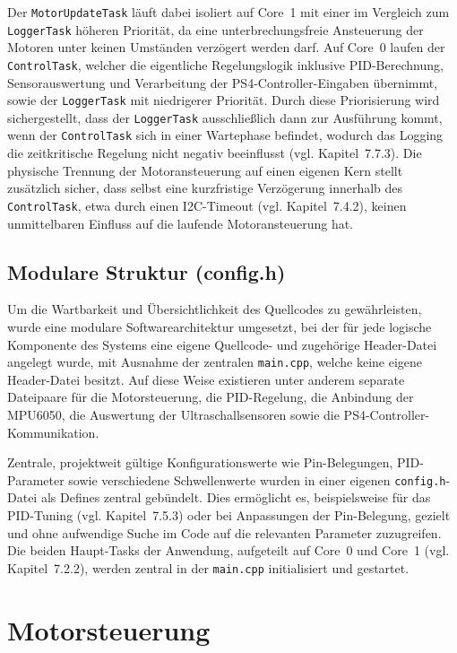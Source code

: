 \documentclass[12pt,ngerman,numbers=noenddot,abstracton,headsepline]{scrreprt}
\begin{document}
Der \texttt{MotorUpdateTask} läuft dabei isoliert auf Core~1 mit einer im Vergleich zum \texttt{LoggerTask} höheren Priorität, da eine unterbrechungsfreie Ansteuerung der Motoren unter keinen Umständen verzögert werden darf. Auf Core~0 laufen der \texttt{ControlTask}, welcher die eigentliche Regelungslogik inklusive PID-Berechnung, Sensorauswertung und Verarbeitung der PS4-Controller-Eingaben übernimmt, sowie der \texttt{LoggerTask} mit niedrigerer Priorität. Durch diese Priorisierung wird sichergestellt, dass der \texttt{LoggerTask} ausschließlich dann zur Ausführung kommt, wenn der \texttt{ControlTask} sich in einer Wartephase befindet, wodurch das Logging die zeitkritische Regelung nicht negativ beeinflusst (vgl. Kapitel~7.7.3). Die physische Trennung der Motoransteuerung auf einen eigenen Kern stellt zusätzlich sicher, dass selbst eine kurzfristige Verzögerung innerhalb des \texttt{ControlTask}, etwa durch einen I2C-Timeout (vgl. Kapitel~7.4.2), keinen unmittelbaren Einfluss auf die laufende Motoransteuerung hat.

\subsection{Modulare Struktur (config.h)}
\label{subsec:modulare_struktur}

Um die Wartbarkeit und Übersichtlichkeit des Quellcodes zu gewährleisten, wurde eine modulare Softwarearchitektur umgesetzt, bei der für jede logische Komponente des Systems eine eigene Quellcode- und zugehörige Header-Datei angelegt wurde, mit Ausnahme der zentralen \texttt{main.cpp}, welche keine eigene Header-Datei besitzt. Auf diese Weise existieren unter anderem separate Dateipaare für die Motorsteuerung, die PID-Regelung, die Anbindung der MPU6050, die Auswertung der Ultraschallsensoren sowie die PS4-Controller-Kommunikation.

Zentrale, projektweit gültige Konfigurationswerte wie Pin-Belegungen, PID-Parameter sowie verschiedene Schwellenwerte wurden in einer eigenen \texttt{config.h}-Datei als Defines zentral gebündelt. Dies ermöglicht es, beispielsweise für das PID-Tuning (vgl. Kapitel~7.5.3) oder bei Anpassungen der Pin-Belegung, gezielt und ohne aufwendige Suche im Code auf die relevanten Parameter zuzugreifen. Die beiden Haupt-Tasks der Anwendung, aufgeteilt auf Core~0 und Core~1 (vgl. Kapitel~7.2.2), werden zentral in der \texttt{main.cpp} initialisiert und gestartet.

\section{Motorsteuerung}
\label{sec:motorsteuerung}
\end{document}
